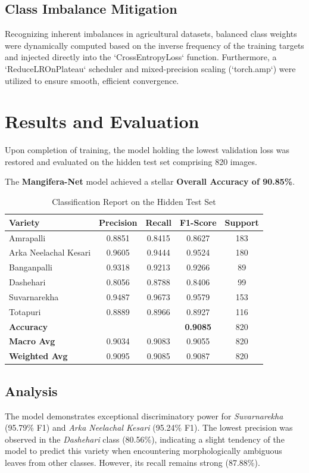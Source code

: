\documentclass[12pt,a4paper]{article}
\begin{document}
\subsection{Class Imbalance Mitigation}
Recognizing inherent imbalances in agricultural datasets, balanced class weights were dynamically computed based on the inverse frequency of the training targets and injected directly into the `CrossEntropyLoss` function. Furthermore, a `ReduceLROnPlateau` scheduler and mixed-precision scaling (`torch.amp`) were utilized to ensure smooth, efficient convergence.

\section{Results and Evaluation}
Upon completion of training, the model holding the lowest validation loss was restored and evaluated on the hidden test set comprising 820 images.

The \textbf{Mangifera-Net} model achieved a stellar \textbf{Overall Accuracy of 90.85\%}. 

\begin{table}[H]
\centering
\begin{tabular}{l c c c c}
\toprule
\textbf{Variety} & \textbf{Precision} & \textbf{Recall} & \textbf{F1-Score} & \textbf{Support} \\
\midrule
Amrapalli & 0.8851 & 0.8415 & 0.8627 & 183 \\
Arka Neelachal Kesari & 0.9605 & 0.9444 & 0.9524 & 180 \\
Banganpalli & 0.9318 & 0.9213 & 0.9266 & 89 \\
Dashehari & 0.8056 & 0.8788 & 0.8406 & 99 \\
Suvarnarekha & 0.9487 & 0.9673 & 0.9579 & 153 \\
Totapuri & 0.8889 & 0.8966 & 0.8927 & 116 \\
\midrule
\textbf{Accuracy} & & & \textbf{0.9085} & 820 \\
\textbf{Macro Avg} & 0.9034 & 0.9083 & 0.9055 & 820 \\
\textbf{Weighted Avg} & 0.9095 & 0.9085 & 0.9087 & 820 \\
\bottomrule
\end{tabular}
\caption{Classification Report on the Hidden Test Set}
\end{table}

\subsection{Analysis}
The model demonstrates exceptional discriminatory power for \textit{Suvarnarekha} (95.79\% F1) and \textit{Arka Neelachal Kesari} (95.24\% F1). The lowest precision was observed in the \textit{Dashehari} class (80.56\%), indicating a slight tendency of the model to predict this variety when encountering morphologically ambiguous leaves from other classes. However, its recall remains strong (87.88\%). 
\end{document}
